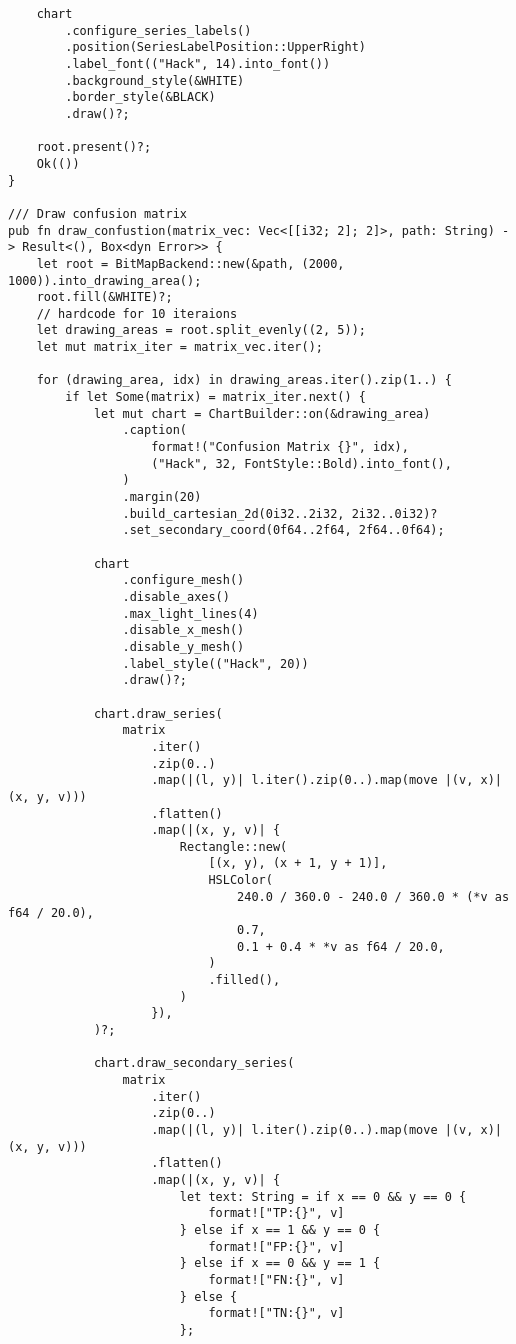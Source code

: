 \begin{verbatim}
    chart
        .configure_series_labels()
        .position(SeriesLabelPosition::UpperRight)
        .label_font(("Hack", 14).into_font())
        .background_style(&WHITE)
        .border_style(&BLACK)
        .draw()?;

    root.present()?;
    Ok(())
}

/// Draw confusion matrix
pub fn draw_confustion(matrix_vec: Vec<[[i32; 2]; 2]>, path: String) -> Result<(), Box<dyn Error>> {
    let root = BitMapBackend::new(&path, (2000, 1000)).into_drawing_area();
    root.fill(&WHITE)?;
    // hardcode for 10 iteraions
    let drawing_areas = root.split_evenly((2, 5));
    let mut matrix_iter = matrix_vec.iter();

    for (drawing_area, idx) in drawing_areas.iter().zip(1..) {
        if let Some(matrix) = matrix_iter.next() {
            let mut chart = ChartBuilder::on(&drawing_area)
                .caption(
                    format!("Confusion Matrix {}", idx),
                    ("Hack", 32, FontStyle::Bold).into_font(),
                )
                .margin(20)
                .build_cartesian_2d(0i32..2i32, 2i32..0i32)?
                .set_secondary_coord(0f64..2f64, 2f64..0f64);

            chart
                .configure_mesh()
                .disable_axes()
                .max_light_lines(4)
                .disable_x_mesh()
                .disable_y_mesh()
                .label_style(("Hack", 20))
                .draw()?;

            chart.draw_series(
                matrix
                    .iter()
                    .zip(0..)
                    .map(|(l, y)| l.iter().zip(0..).map(move |(v, x)| (x, y, v)))
                    .flatten()
                    .map(|(x, y, v)| {
                        Rectangle::new(
                            [(x, y), (x + 1, y + 1)],
                            HSLColor(
                                240.0 / 360.0 - 240.0 / 360.0 * (*v as f64 / 20.0),
                                0.7,
                                0.1 + 0.4 * *v as f64 / 20.0,
                            )
                            .filled(),
                        )
                    }),
            )?;

            chart.draw_secondary_series(
                matrix
                    .iter()
                    .zip(0..)
                    .map(|(l, y)| l.iter().zip(0..).map(move |(v, x)| (x, y, v)))
                    .flatten()
                    .map(|(x, y, v)| {
                        let text: String = if x == 0 && y == 0 {
                            format!["TP:{}", v]
                        } else if x == 1 && y == 0 {
                            format!["FP:{}", v]
                        } else if x == 0 && y == 1 {
                            format!["FN:{}", v]
                        } else {
                            format!["TN:{}", v]
                        };


\end{verbatim}
